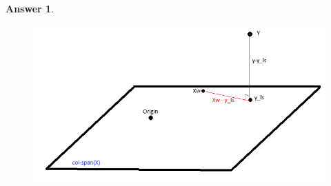 \documentclass{article}
\theoremstyle{definition}
\newtheorem*{answer}{Answer}
\begin{document}
\begin{question}[start=0]
\begin{question}
\begin{answer}
		\begin{figure}[h]
			\begin{center}
				\includegraphics[scale=0.5]{./fig/geo.png}
			\end{center}
		\end{figure}
	\end{answer}
	\end{question}
	
	
\end{question}
\end{document}
